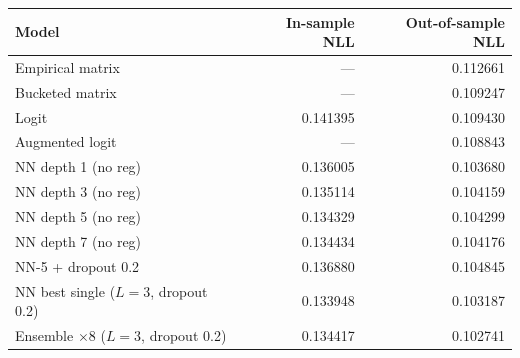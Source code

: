 \begin{tabular}{lrr}
\toprule
Model & In-sample NLL & Out-of-sample NLL \\
\midrule
Empirical matrix & --- & 0.112661 \\
Bucketed matrix & --- & 0.109247 \\
Logit & 0.141395 & 0.109430 \\
Augmented logit & --- & 0.108843 \\
NN depth 1 (no reg) & 0.136005 & 0.103680 \\
NN depth 3 (no reg) & 0.135114 & 0.104159 \\
NN depth 5 (no reg) & 0.134329 & 0.104299 \\
NN depth 7 (no reg) & 0.134434 & 0.104176 \\
NN-5 + dropout 0.2 & 0.136880 & 0.104845 \\
NN best single ($L{=}3$, dropout 0.2) & 0.133948 & 0.103187 \\
Ensemble $\times 8$ ($L{=}3$, dropout 0.2) & 0.134417 & 0.102741 \\
\bottomrule
\end{tabular}
